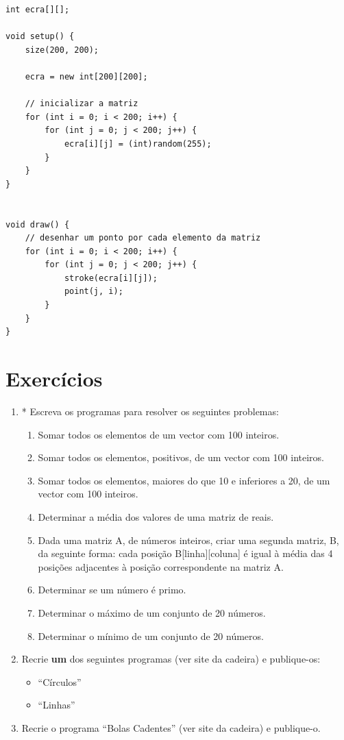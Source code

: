 \begin{lstlisting}
int ecra[][];

void setup() {
    size(200, 200);
    
    ecra = new int[200][200];
    
    // inicializar a matriz
    for (int i = 0; i < 200; i++) {
        for (int j = 0; j < 200; j++) {
            ecra[i][j] = (int)random(255);
        }
    }
}


void draw() { 
    // desenhar um ponto por cada elemento da matriz
    for (int i = 0; i < 200; i++) {
        for (int j = 0; j < 200; j++) {
            stroke(ecra[i][j]);
            point(j, i);
        }
    }    
}
\end{lstlisting}



\section{Exercícios}

\begin{enumerate}
\item \label{exe_5_ciclos}
* Escreva os programas para resolver os seguintes problemas:
\begin{enumerate}
\item Somar todos os elementos de um vector com 100 inteiros.

\item Somar todos os elementos, positivos, de um vector com 100 inteiros.

\item Somar todos os elementos, maiores do que 10 e inferiores a 20, de um vector com 100 inteiros.

\item Determinar a média dos valores de uma matriz de reais.

\item Dada uma matriz A, de números inteiros, criar uma segunda matriz, B, da seguinte forma: cada posição B[linha][coluna] 
é igual à média das 4 posições adjacentes à posição correspondente na matriz A.

\item Determinar se um número é primo.

\item Determinar o máximo de um conjunto de 20 números.

\item Determinar o mínimo de um conjunto de 20 números.

\end{enumerate}


\item 
Recrie \textbf{um} dos seguintes programas (ver site da cadeira) e publique-os:
\begin{itemize}
	\item ``Círculos''
	\item ``Linhas''
\end{itemize}

\item Recrie o programa ``Bolas Cadentes'' (ver site da cadeira) e publique-o.
\end{enumerate}